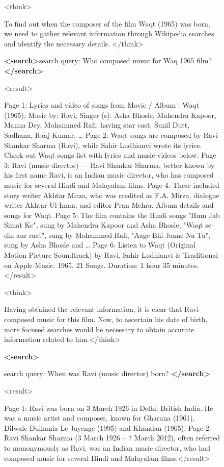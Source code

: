 \documentclass{llmxive}
\begin{document}
\begin{figure}[h]
\centering
 
\begin{tcolorbox}[
    colback=gray!5!white, 
    colframe=brown!75!brown, 
    title=Case-3 (Tool-Star RL Dataset): when the composer of the film Waqt (1965) was born?, 
    boxrule=0.3mm, 
    width=\linewidth,  
    arc=2mm, 
    auto outer arc=true
] 

<think> 

To find out when the composer of the film Waqt (1965) was born, we need to gather relevant information through Wikipedia searches and identify the necessary details. </think>


\textbf{<search>}search query: Who composed music for Waq 1965 film? \textbf{</search>}

<result>

Page 1: Lyrics and video of songs from Movie / Album : Waqt (1965); Music by: Ravi; Singer (s): Asha Bhosle, Mahendra Kapoor, Manna Dey, Mohammed Rafi; having star cast: Sunil Dutt, Sadhana, Raaj Kumar, …
Page 2: Waqt songs are composed by Ravi Shankar Sharma (Ravi), while Sahir Ludhianvi wrote its lyrics. Check out Waqt songs list with lyrics and music videos below.
Page 3: Ravi (music director) — Ravi Shankar Sharma, better known by his first name Ravi, is an Indian music director, who has composed music for several Hindi and Malayalam films.
Page 4: These included story writer Akhtar Mirza, who was credited as F.A. Mirza, dialogue writer Akhtar-Ul-Iman, and editor Pran Mehra. Album details and songs for Waqt.
Page 5: The film contains the Hindi songs "Hum Jab Simat Ke", sung by Mahendra Kapoor and Asha Bhosle, "Waqt se din aur raat", sung by Mohammed Rafi, "Aage Bhi Jaane Na Tu", sung by Asha Bhosle and …
Page 6: Listen to Waqt (Original Motion Picture Soundtrack) by Ravi, Sahir Ludhianvi \& Traditional on Apple Music. 1965. 21 Songs. Duration: 1 hour 35 minutes. </result> 

<think> 

Having obtained the relevant information, it is clear that Ravi composed music for this film. Now, to ascertain his date of birth, more focused searches would be necessary to obtain accurate information related to him.</think>

\textbf{<search>} 

search query: When was Ravi (music director) born?  \textbf{</search>}

<result>

Page 1: Ravi was born on 3 March 1926 in Delhi, British India. He was a music artist and composer, known for Gharana (1961), Dilwale Dulhania Le Jayenge (1995) and Khandan (1965).
Page 2: Ravi Shankar Sharma (3 March 1926 – 7 March 2012), often referred to mononymously as Ravi, was an Indian music director, who had composed music for several Hindi and Malayalam films.</result>  


\end{tcolorbox}
\end{figure}
\end{document}
